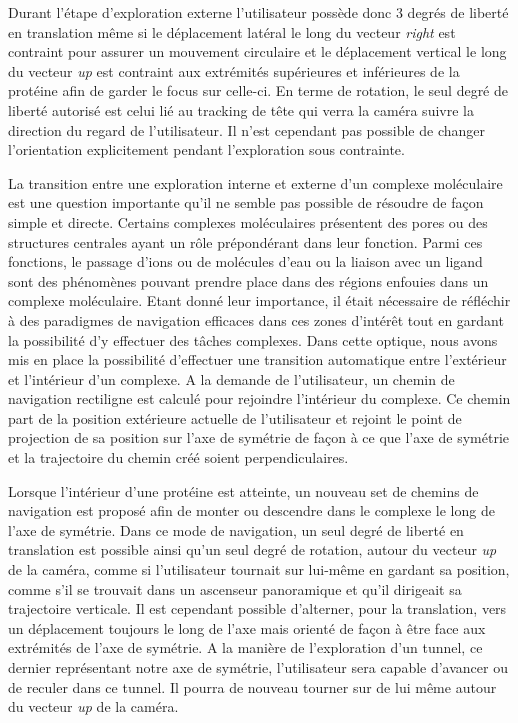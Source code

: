 Durant l'étape d'exploration externe l'utilisateur possède donc 3 degrés de liberté en translation même si le déplacement latéral le long du vecteur \textit{right} est contraint pour assurer un mouvement circulaire et le déplacement vertical le long du vecteur \textit{up} est contraint aux extrémités supérieures et inférieures de la protéine afin de garder le focus sur celle-ci. En terme de rotation, le seul degré de liberté autorisé est celui lié au tracking de tête qui verra la caméra suivre la direction du regard de l'utilisateur. Il n'est cependant pas possible de changer l'orientation explicitement pendant l'exploration sous contrainte.

La transition entre une exploration interne et externe d'un complexe moléculaire est une question importante qu'il ne semble pas possible de résoudre de façon simple et directe. Certains complexes moléculaires présentent des pores ou des structures centrales ayant un rôle prépondérant dans leur fonction. Parmi ces fonctions, le passage d'ions ou de molécules d'eau ou la liaison avec un ligand sont des phénomènes pouvant prendre place dans des régions enfouies dans un complexe moléculaire. Etant donné leur importance, il était nécessaire de réfléchir à des paradigmes de navigation efficaces dans ces zones d'intérêt tout en gardant la possibilité d'y effectuer des tâches complexes. Dans cette optique, nous avons mis en place la possibilité d'effectuer une transition automatique entre l'extérieur et l'intérieur d'un complexe. A la demande de l'utilisateur, un chemin de navigation rectiligne est calculé pour rejoindre l'intérieur du complexe. Ce chemin part de la position extérieure actuelle de l'utilisateur et rejoint le point de projection de sa position sur l'axe de symétrie de façon à ce que l'axe de symétrie et la trajectoire du chemin créé soient perpendiculaires. 

Lorsque l'intérieur d'une protéine est atteinte, un nouveau set de chemins de navigation est proposé afin de monter ou descendre dans le complexe le long de l'axe de symétrie. Dans ce mode de navigation, un seul degré de liberté en translation est possible ainsi qu'un seul degré de rotation, autour du vecteur \textit{up} de la caméra, comme si l'utilisateur tournait sur lui-même en gardant sa position, comme s'il se trouvait dans un ascenseur panoramique et qu'il dirigeait sa trajectoire verticale. Il est cependant possible d'alterner, pour la translation, vers un déplacement toujours le long de l'axe mais orienté de façon à être face aux extrémités de l'axe de symétrie. A la manière de l'exploration d'un tunnel, ce dernier représentant notre axe de symétrie, l'utilisateur sera capable d'avancer ou de reculer dans ce tunnel. Il pourra de nouveau tourner sur de lui même autour du vecteur \textit{up} de la caméra.

